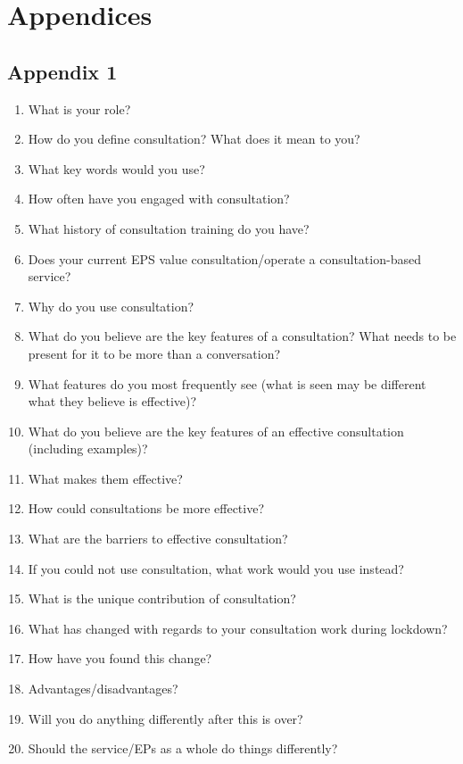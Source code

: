 \documentclass[
  english,
  man]{apa}
\providecommand{\tightlist}{%
  \setlength{\itemsep}{0pt}\setlength{\parskip}{0pt}}
\begin{document}
\hypertarget{appendices}{%
\section{Appendices}\label{appendices}}

\hypertarget{appendix-1}{%
\subsection{Appendix 1}\label{appendix-1}}

\begin{enumerate}
\def\labelenumi{\arabic{enumi})}
\tightlist
\item
  What is your role?
\item
  How do you define consultation? What does it mean to you?
\item
  What key words would you use?
\item
  How often have you engaged with consultation?
\item
  What history of consultation training do you have?
\item
  Does your current EPS value consultation/operate a
  consultation-based service?
\item
  Why do you use consultation?
\item
  What do you believe are the key features of a consultation? What
  needs to be present for it to be more than a conversation?
\item
  What features do you most frequently see (what is seen may be
  different what they believe is effective)?
\item
  What do you believe are the key features of an effective
  consultation (including examples)?
\item
  What makes them effective?
\item
  How could consultations be more effective?
\item
  What are the barriers to effective consultation?
\item
  If you could not use consultation, what work would you use instead?
\item
  What is the unique contribution of consultation?
\item
  What has changed with regards to your consultation work during
  lockdown?
\item
  How have you found this change?
\item
  Advantages/disadvantages?
\item
  Will you do anything differently after this is over?
\item
  Should the service/EPs as a whole do things differently?
\end{enumerate}
\end{document}
